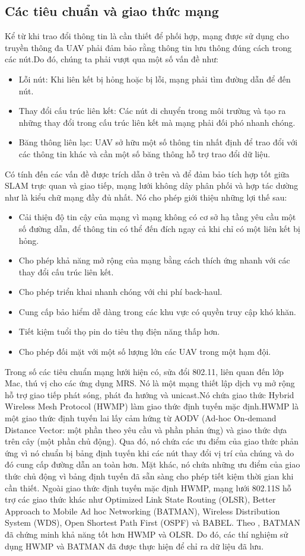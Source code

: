 \documentclass[11pt,openany]{book}
\begin{document}
\subsection{Các tiêu chuẩn và giao thức mạng}
Kể từ khi trao đổi thông tin là cần thiết để phối hợp, mạng được sử dụng cho truyền thông đa UAV phải đảm bảo rằng thông tin lưu thông đúng cách trong các nút.Do đó, chúng ta phải vượt qua một số vấn đề như:
\begin{itemize}
    \item Lỗi nút: Khi liên kết bị hỏng hoặc bị lỗi, mạng phải tìm đường dẫn để đến nút.
    \item Thay đổi cấu trúc liên kết: Các nút di chuyển trong môi trường và tạo ra những thay đổi trong cấu trúc liên kết mà mạng phải đối phó nhanh chóng.
    \item Băng thông liên lạc: UAV sở hữu một số thông tin nhất định để trao đổi với các thông tin khác và cần một số băng thông hỗ trợ trao đổi dữ liệu.
\end{itemize}
Có tính đến các vấn đề được trích dẫn ở trên và để đảm bảo tích hợp tốt giữa SLAM trực quan và giao tiếp, mạng lưới không dây phân phối và hợp tác dường như là kiểu chữ mạng đầy đủ nhất. Nó cho phép giới thiệu những lợi thế sau:
\begin{itemize}
    \item Cải thiện độ tin cậy của mạng vì mạng không có cơ sở hạ tầng yêu cầu một số đường dẫn, để thông tin có thể đến đích ngay cả khi chỉ có một liên kết bị hỏng.
    \item Cho phép khả năng mở rộng của mạng bằng cách thích ứng nhanh với các thay đổi cấu trúc liên kết.
    \item Cho phép triển khai nhanh chóng với chi phí back-haul.
    \item Cung cấp bảo hiểm dễ dàng trong các khu vực có quyền truy cập khó khăn.
    \item Tiết kiệm tuổi thọ pin do tiêu thụ điện năng thấp hơn.
    \item Cho phép đối mặt với một số lượng lớn các UAV trong một hạm đội.
\end{itemize}
Trong số các tiêu chuẩn mạng lưới hiện có, sửa đổi 802.11, liên quan đến lớp Mac, thú vị cho các ứng dụng MRS. Nó là một mạng thiết lập dịch vụ mở rộng hỗ trợ giao tiếp phát sóng, phát đa hướng và unicast.Nó chứa giao thức Hybrid Wireless Mesh Protocol (HWMP) làm giao thức định tuyến mặc định.HWMP là một giao thức định tuyến lai lấy cảm hứng từ AODV (Ad-hoc On-demand Distance Vector: một phần theo yêu cầu và phần phản ứng) và giao thức dựa trên cây (một phần chủ động). Qua đó, nó chứa các ưu điểm của giao thức phản ứng vì nó chuẩn bị bảng định tuyến khi các nút thay đổi vị trí của chúng và do đó cung cấp đường dẫn an toàn hơn. Mặt khác, nó chứa những ưu điểm của giao thức chủ động vì bảng định tuyến đã sẵn sàng cho phép tiết kiệm thời gian khi cần thiết. Ngoài giao thức định tuyến mặc định HWMP, mạng lưới 802.11S hỗ trợ các giao thức khác như Optimized Link State Routing (OLSR), Better Approach to Mobile Ad hoc Networking (BATMAN), Wireless Distribution System (WDS), Open Shortest Path First (OSPF) và BABEL. Theo \cite{wang2010experimental}, BATMAN đã chứng minh khả năng tốt hơn HWMP và OLSR. Do đó, các thí nghiệm sử dụng HWMP và BATMAN đã được thực hiện để chỉ ra dữ liệu đã lưu.
\end{document}
